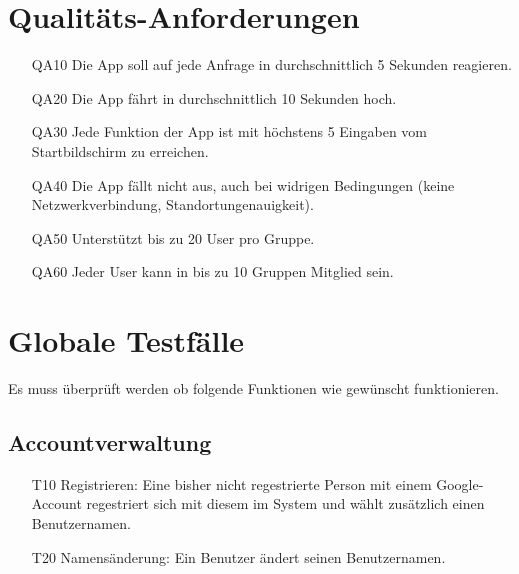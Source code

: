 \documentclass{scrartcl}
\begin{document}
	\newpage
	
	
	\section{Qualitäts-Anforderungen}
	\begin{itemize}[nosep] 
		\item[QA10] Die App soll auf jede Anfrage in durchschnittlich 5 Sekunden reagieren.
		\item[QA20] Die App fährt in durchschnittlich 10 Sekunden hoch.
		\item[QA30] Jede Funktion der App ist mit höchstens 5 Eingaben vom Startbildschirm zu erreichen.
		\item[QA40] Die App fällt nicht aus, auch bei widrigen Bedingungen (keine Netzwerkverbindung, Standortungenauigkeit).
		\item[QA50] Unterstützt bis zu 20 User pro Gruppe.
		\item[QA60] Jeder User kann in bis zu 10 Gruppen Mitglied sein.
	\end{itemize}
	
	\newpage
	
	
	\section{Globale Testfälle}

	Es muss überprüft werden ob folgende Funktionen wie gewünscht funktionieren.
	
	\subsection{Accountverwaltung}
	\begin{itemize}[nosep] 
		\item[T10] Registrieren: Eine bisher nicht regestrierte Person mit einem Google-Account regestriert sich mit diesem im System und wählt zusätzlich einen Benutzernamen.
		\item[T20] Namensänderung: Ein Benutzer ändert seinen Benutzernamen.
	\end{itemize}	
	
\end{document}
